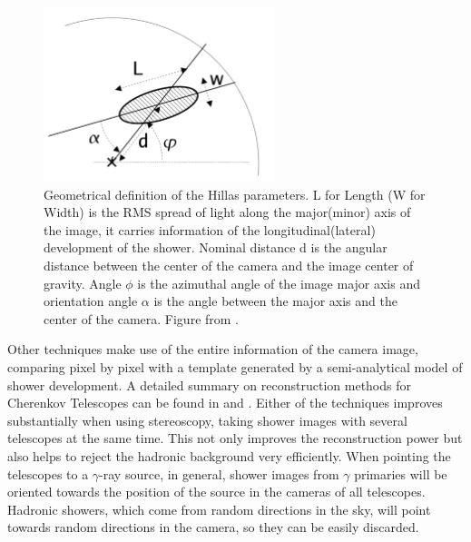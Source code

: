 \documentclass[main.tex]{subfiles}
\begin{document}
\begin{figure}[h]
  \centering
  \includegraphics[width=0.6\textwidth]{Pictures/Hillaspars.pdf}
  \caption{Geometrical definition of the Hillas parameters. L for Length (W for Width) is the RMS spread of light along the major(minor) axis of the image, it carries information of the longitudinal(lateral) development of the shower. Nominal distance d is the angular distance between the center of the camera and the image center of gravity. Angle $\phi$ is the azimuthal angle of the image major axis and orientation angle $\alpha$ is the angle between the major axis and the center of the camera. Figure from \cite{2006analysismethodscherenkovtels}. }
  \label{fig:hillas}
\end{figure}

Other techniques make use of the entire information of the camera image, comparing pixel by pixel with a template generated by a semi-analytical model of shower development. A detailed summary on reconstruction methods for Cherenkov Telescopes can be found in \cite{2006analysismethodscherenkovtels} and \cite{2015groundbasedtechniques}.
Either of the techniques improves substantially when using stereoscopy, taking shower images with several telescopes at the same time. This not only improves the reconstruction power but also helps to reject the hadronic background very efficiently. When pointing the telescopes to a $\gamma$-ray source, in general, shower images from $\gamma$ primaries will be oriented towards the position of the source in the cameras of all telescopes. Hadronic showers, which come from random directions in the sky, will point towards random directions in the camera, so they can be easily discarded.
\end{document}
